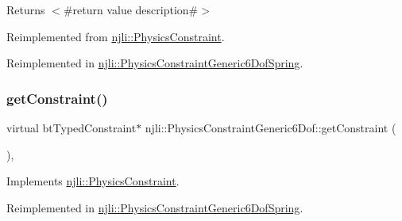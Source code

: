 \begin{DoxyReturn}{Returns}
$<$\#return value description\#$>$ 
\end{DoxyReturn}


Reimplemented from \mbox{\hyperlink{classnjli_1_1_physics_constraint_a4d31c5267199972942d66b3480374010}{njli\+::\+Physics\+Constraint}}.



Reimplemented in \mbox{\hyperlink{classnjli_1_1_physics_constraint_generic6_dof_spring_a8a44bad32336f595195ccfa836a91068}{njli\+::\+Physics\+Constraint\+Generic6\+Dof\+Spring}}.

\mbox{\label{classnjli_1_1_physics_constraint_generic6_dof_a0591b18e41f1e1e349ba3cef3e8cf4a4}} 
\subsubsection{\texorpdfstring{get\+Constraint()}{getConstraint()}\hspace{0.1cm}{\footnotesize\ttfamily [1/2]}}
{\footnotesize\ttfamily virtual bt\+Typed\+Constraint$\ast$ njli\+::\+Physics\+Constraint\+Generic6\+Dof\+::get\+Constraint (\begin{DoxyParamCaption}{ }\end{DoxyParamCaption})\hspace{0.3cm}{\ttfamily [protected]}, {\ttfamily [virtual]}}



Implements \mbox{\hyperlink{classnjli_1_1_physics_constraint_a0a22d54c2c896af49fa57db9be76a5da}{njli\+::\+Physics\+Constraint}}.



Reimplemented in \mbox{\hyperlink{classnjli_1_1_physics_constraint_generic6_dof_spring_aa90bf42f88d0314d834a6b3d670ba90d}{njli\+::\+Physics\+Constraint\+Generic6\+Dof\+Spring}}.

\mbox{\label{classnjli_1_1_physics_constraint_generic6_dof_a55d44efd5fb9dcd1f983f3bb5f2ac6d5}} 
